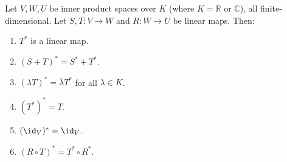 \begin{lemma}
\label{lem:properties_adjoint_map}
Let $V, W, U$ be inner product spaces over $K$ (where $K = \mathbb{R}$ or $\mathbb{C}$), all finite-di\-men\-sional. Let $S, T \colon V \to W$ and $R \colon W \to U$ be linear maps. Then:
\begin{enumerate}[label=\textbf{(\alph*)}]
    \item $T^*$ is a linear map.
    \item $(S+T)^* = S^* + T^*$.
    \item $(\lambda T)^* = \overline{\lambda} T^*$ for all $\lambda \in K$.
    \item $(T^*)^* = T$.
    \item $(\id_V)^* = \id_V$.
    \item $(R \circ T)^* = T^* \circ R^*$.
\end{enumerate}
\end{lemma}


